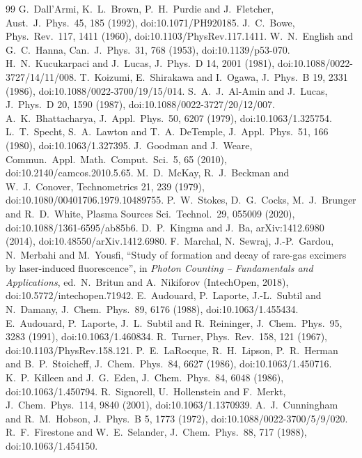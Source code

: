 \documentclass[11pt]{article}
\begin{document}
\begin{thebibliography}{99}
 G.~Dall'Armi, K.~L.~Brown, P.~H.~Purdie and J.~Fletcher, Aust.\ J.\ Phys.\ 45, 185 (1992), doi:10.1071/PH920185.
 J.~C.~Bowe, Phys.\ Rev.\ 117, 1411 (1960), doi:10.1103/PhysRev.117.1411.
 W.~N.~English and G.~C.~Hanna, Can.\ J.\ Phys.\ 31, 768 (1953), doi:10.1139/p53-070.
 H.~N.~Kucukarpaci and J.~Lucas, J.\ Phys.\ D 14, 2001 (1981), doi:10.1088/0022-3727/14/11/008.
 T.~Koizumi, E.~Shirakawa and I.~Ogawa, J.\ Phys.\ B 19, 2331 (1986), doi:10.1088/0022-3700/19/15/014.
 S.~A.~J.~Al-Amin and J.~Lucas, J.\ Phys.\ D 20, 1590 (1987), doi:10.1088/0022-3727/20/12/007.
 A.~K.~Bhattacharya, J.\ Appl.\ Phys.\ 50, 6207 (1979), doi:10.1063/1.325754.
 L.~T.~Specht, S.~A.~Lawton and T.~A.~DeTemple, J.\ Appl.\ Phys.\ 51, 166 (1980), doi:10.1063/1.327395.
 J.~Goodman and J.~Weare, Commun.\ Appl.\ Math.\ Comput.\ Sci.\ 5, 65 (2010), doi:10.2140/camcos.2010.5.65.
 M.~D.~McKay, R.~J.~Beckman and W.~J.~Conover, Technometrics 21, 239 (1979), doi:10.1080/00401706.1979.10489755.
 P.~W.~Stokes, D.~G.~Cocks, M.~J.~Brunger and R.~D.~White, Plasma Sources Sci.\ Technol.\ 29, 055009 (2020), doi:10.1088/1361-6595/ab85b6.
 D.~P.~Kingma and J.~Ba, arXiv:1412.6980 (2014), doi:10.48550/arXiv.1412.6980.
 F.~Marchal, N.~Sewraj, J.-P.~Gardou, N.~Merbahi and M.~Yousfi, ``Study of formation and decay of rare-gas excimers by laser-induced fluorescence'', in \emph{Photon Counting -- Fundamentals and Applications}, ed.\ N.~Britun and A.~Nikiforov (IntechOpen, 2018), doi:10.5772/intechopen.71942.
 E.~Audouard, P.~Laporte, J.-L.~Subtil and N.~Damany, J.\ Chem.\ Phys.\ 89, 6176 (1988), doi:10.1063/1.455434.
 E.~Audouard, P.~Laporte, J.~L.~Subtil and R.~Reininger, J.\ Chem.\ Phys.\ 95, 3283 (1991), doi:10.1063/1.460834.
 R.~Turner, Phys.\ Rev.\ 158, 121 (1967), doi:10.1103/PhysRev.158.121.
 P.~E.~LaRocque, R.~H.~Lipson, P.~R.~Herman and B.~P.~Stoicheff, J.\ Chem.\ Phys.\ 84, 6627 (1986), doi:10.1063/1.450716.
 K.~P.~Killeen and J.~G.~Eden, J.\ Chem.\ Phys.\ 84, 6048 (1986), doi:10.1063/1.450794.
 R.~Signorell, U.~Hollenstein and F.~Merkt, J.\ Chem.\ Phys.\ 114, 9840 (2001), doi:10.1063/1.1370939.
 A.~J.~Cunningham and R.~M.~Hobson, J.\ Phys.\ B 5, 1773 (1972), doi:10.1088/0022-3700/5/9/020.
 R.~F.~Firestone and W.~E.~Selander, J.\ Chem.\ Phys.\ 88, 717 (1988), doi:10.1063/1.454150.

\end{thebibliography}
\end{document}
